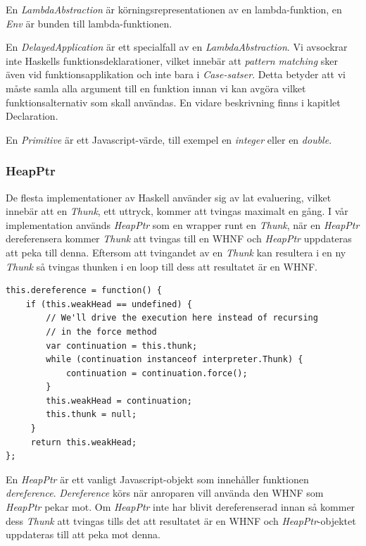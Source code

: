 En \emph{LambdaAbstraction} är körningsrepresentationen av en lambda-funktion, en \emph{Env} är bunden till lambda-funktionen.

En \emph{DelayedApplication} är ett specialfall av en \emph{LambdaAbstraction}. Vi avsockrar inte Haskells funktionsdeklarationer, vilket innebär att \emph{pattern matching} sker även vid funktionsapplikation och inte bara i \emph{Case-satser}. Detta betyder att vi måste samla alla argument till en funktion innan vi kan avgöra vilket funktionsalternativ som skall användas. En vidare beskrivning finns i kapitlet Declaration.

En \emph{Primitive} är ett Javascript-värde, till exempel en \emph{integer} eller en \emph{double}.

\subsubsection{HeapPtr}
De flesta implementationer av Haskell använder sig av lat evaluering, vilket innebär att en \emph{Thunk}, ett uttryck, kommer att tvingas maximalt en gång. I vår implementation används \emph{HeapPtr} som en wrapper runt en \emph{Thunk}, när en \emph{HeapPtr} dereferensera kommer \emph{Thunk} att tvingas till en WHNF och \emph{HeapPtr} uppdateras att peka till denna. Eftersom att tvingandet av en \emph{Thunk} kan resultera i en ny \emph{Thunk} så tvingas thunken i en loop till dess att resultatet är en WHNF.

\begin{lstlisting}
this.dereference = function() {
    if (this.weakHead == undefined) {
        // We'll drive the execution here instead of recursing 
        // in the force method
        var continuation = this.thunk;
        while (continuation instanceof interpreter.Thunk) {
            continuation = continuation.force();
        }
        this.weakHead = continuation;
        this.thunk = null;
     }
     return this.weakHead;
};
\end{lstlisting}
En \emph{HeapPtr} är ett vanligt Javascript-objekt som innehåller funktionen \emph{dereference}. \emph{Dereference} körs när anroparen vill använda den WHNF som \emph{HeapPtr} pekar mot. Om \emph{HeapPtr} inte har blivit dereferenserad innan så kommer dess \emph{Thunk} att tvingas tills det att resultatet är en WHNF och \emph{HeapPtr}-objektet uppdateras till att peka mot denna.

